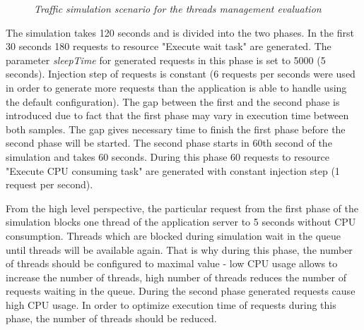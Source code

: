 \documentclass[12pt,a4paper]{article}
\begin{document}
\begin{figure}[!htb]
\begin{center}
\caption{\textit{Traffic simulation scenario for the threads management evaluation}} \label{figure:trafficthreads}
\end{center}
\end{figure}

The simulation takes 120 seconds and is divided into the two phases. In the first 30 seconds 180 requests to resource "Execute wait task" are generated. The parameter \textit{sleepTime} for generated requests in this phase is set to 5000 (5 seconds). Injection step of requests is constant (6 requests per seconds were used in order to generate more requests than the application is able to handle using the default configuration). The gap between the first and the second phase is introduced due to fact that the first phase may vary in execution time between both samples. The gap gives necessary time to finish the first phase before the second phase will be started. The second phase starts in 60th second of the simulation and takes 60 seconds. During this phase 60 requests to resource "Execute CPU consuming task" are generated with constant injection step (1 request per second). 

From the high level perspective, the particular request from the first phase of the simulation blocks one thread of the application server to 5 seconds without CPU consumption. Threads which are blocked during simulation wait in the queue until threads will be available again. That is why during this phase, the number of threads should be configured to maximal value - low CPU usage allows to increase the number of threads, high number of threads reduces the number of requests waiting in the queue. During the second phase generated requests cause high CPU usage. In order to optimize execution time of requests during this phase, the number of threads should be reduced.    
\end{document}
